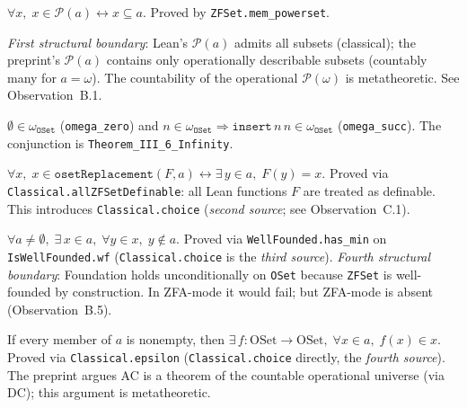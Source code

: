 \begin{theorem}
\label{thm:T_III_5}
\leanok
{}
$\forall x,\; x \in \mathcal{P}(a) \leftrightarrow x \subseteq a$.
Proved by \texttt{ZFSet.mem\_powerset}.

\emph{First structural boundary}: Lean's $\mathcal{P}(a)$ admits all
subsets (classical); the preprint's $\mathcal{P}(a)$ contains only
operationally describable subsets (countably many for $a = \omega$).
The countability of the operational $\mathcal{P}(\omega)$ is
metatheoretic.  See Observation~B.1.
\end{theorem}

\begin{theorem}
\label{thm:T_III_6_inf}
\leanok
{}
$\emptyset \in \omega_{\texttt{OSet}}$ (\texttt{omega\_zero}) and
$n \in \omega_{\texttt{OSet}} \Rightarrow \texttt{insert}\,n\,n \in
\omega_{\texttt{OSet}}$ (\texttt{omega\_succ}).  The conjunction is
\texttt{Theorem\_III\_6\_Infinity}.
\end{theorem}

\begin{theorem}
\label{thm:T_III_7}
\leanok
{}
$\forall x,\; x \in \texttt{osetReplacement}(F, a) \leftrightarrow \exists\,
y \in a,\; F(y) = x$.
Proved via \texttt{Classical.allZFSetDefinable}: all Lean functions $F$
are treated as definable.  This introduces \texttt{Classical.choice}
(\emph{second source}; see Observation~C.1).
\end{theorem}

\begin{theorem}
\label{thm:T_III_8}
\leanok
{}
$\forall a \ne \emptyset,\; \exists\, x \in a,\; \forall y \in x,\; y \notin a$.
Proved via \texttt{WellFounded.has\_min} on \texttt{IsWellFounded.wf}
(\texttt{Classical.choice} is the \emph{third source}).
\emph{Fourth structural boundary}: Foundation holds unconditionally on
\texttt{OSet} because \texttt{ZFSet} is well-founded by construction.
In ZFA-mode it would fail; but ZFA-mode is absent (Observation~B.5).
\end{theorem}

\begin{theorem}
\label{thm:T_III_9}
\leanok
{}
If every member of $a$ is nonempty, then $\exists\, f : \mathrm{OSet}
\to \mathrm{OSet},\; \forall x \in a,\; f(x) \in x$.
Proved via \texttt{Classical.epsilon} (\texttt{Classical.choice}
directly, the \emph{fourth source}).  The preprint argues AC is a
theorem of the countable operational universe (via DC); this argument
is metatheoretic.
\end{theorem}

